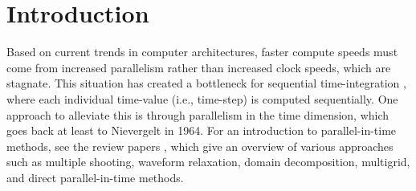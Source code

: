 \documentclass[VANCOUVER,STIX1COL]{WileyNJD-v2}
\begin{document}


\maketitle

\section{Introduction}
\label{sec:intro}

Based on current trends in computer architectures, faster compute speeds must come from increased parallelism rather than increased clock speeds, which are stagnate. This situation has created a bottleneck for sequential time-integration \cite{Ga2015, Fa2014, OnSc2019}, where each individual time-value (i.e., time-step) is computed sequentially. 
One approach to alleviate this is through parallelism in the time dimension, which goes back at least to Nievergelt \cite{Ni1964} in 1964.
For an introduction to parallel-in-time methods, see the review papers \cite{Ga2015, OnSc2019}, which give an overview of various approaches such as multiple shooting, waveform relaxation, domain decomposition, multigrid, and direct parallel-in-time methods.
\end{document}
